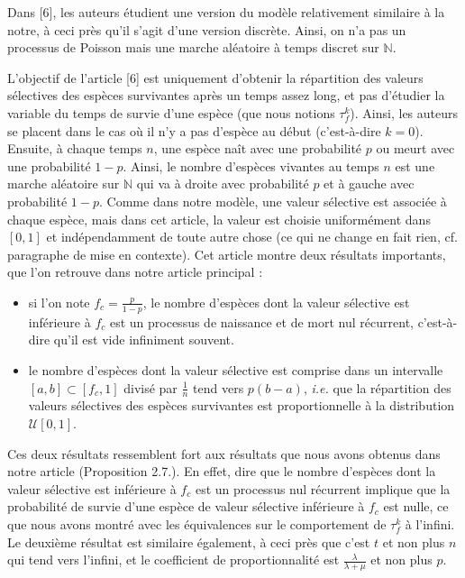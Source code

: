\documentclass[12pt,a4paper]{article}
\begin{document}
Dans [6], les auteurs étudient une version du modèle relativement similaire à la notre, à ceci près qu'il s'agit d'une version discrète. Ainsi, on n'a pas un processus de Poisson mais une marche aléatoire à temps discret sur $\mathbb{N}$. 
\par 
L'objectif de l'article [6] est uniquement d'obtenir la répartition des valeurs sélectives des espèces survivantes après un temps assez long, et pas d'étudier la variable du temps de survie d'une espèce (que nous notions $\tau_f^k$). Ainsi, les auteurs se placent dans le cas où il n'y a pas d'espèce au début (c'est-à-dire $k=0$). Ensuite, à chaque temps $n$, une espèce naît avec une probabilité $p$ ou meurt avec une probabilité $1-p$. Ainsi, le nombre d'espèces vivantes au temps $n$ est une marche aléatoire sur $\mathbb{N}$ qui va à droite avec probabilité $p$ et à gauche avec probabilité $1-p$. Comme dans notre modèle, une valeur sélective est associée à chaque espèce, mais dans cet article, la valeur est choisie uniformément dans $[0,1]$ et indépendamment de toute autre chose (ce qui ne change en fait rien, cf. paragraphe de mise en contexte).
Cet article montre deux résultats importants, que l'on retrouve dans notre article principal : 

\begin{itemize}
    \item si l'on note $f_c = \frac{p}{1-p}$, le nombre d'espèces dont la valeur sélective est inférieure à $f_c$ est un processus de naissance et de mort nul récurrent, c'est-à-dire qu'il est vide infiniment souvent. 
    \item le nombre d'espèces dont la valeur sélective est comprise dans un intervalle $[a,b] \subset [f_c, 1]$ divisé par $\frac{1}{n}$ tend vers $p(b-a)$, \textit{i.e.} que la répartition des valeurs sélectives des espèces survivantes est proportionnelle à la distribution $\mathcal{U}[0,1]$. 
\end{itemize}

Ces deux résultats ressemblent fort aux résultats que nous avons obtenus dans notre article (Proposition 2.7.). En effet, dire que le nombre d'espèces dont la valeur sélective est inférieure à $f_c$ est un processus nul récurrent implique que la probabilité de survie d'une espèce de valeur sélective inférieure à $f_c$ est nulle, ce que nous avons montré avec les équivalences sur le comportement de $\tau_f^k$ à l'infini. Le deuxième résultat est similaire également, à ceci près que c'est $t$ et non plus $n$ qui tend vers l'infini, et le coefficient de proportionnalité est $\frac{\lambda}{\lambda+\mu}$ et non plus $p$. \par 
\end{document}
